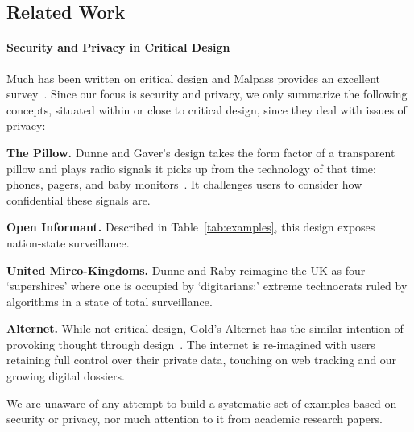 \subsection{Related Work}

\paragraph{Security and Privacy in Critical Design}

Much has been written on critical design and Malpass provides an excellent survey~\cite{Mal17}. Since our focus is security and privacy, we only summarize the following concepts, situated within or close to critical design, since they deal with issues of privacy: 

\begin{compactlist}
\item \textbf{The Pillow.} Dunne and Gaver's design takes the form factor of a transparent pillow and plays radio signals it picks up from the technology of that time: \eg phones, pagers, and baby monitors~\cite{DuGa97}. It challenges users to consider how confidential these signals are.  
\item \textbf{Open Informant.} Described in Table~\ref{tab:examples}, this design exposes nation-state surveillance.
\item \textbf{United Mirco-Kingdoms.} Dunne and Raby reimagine the UK as four `supershires' where one is occupied by `digitarians:' extreme technocrats ruled by algorithms in a state of total surveillance.  
\item \textbf{Alternet.} While not critical design, Gold's Alternet has the similar intention of provoking thought through design~\cite{Gol14}. The internet is re-imagined with users retaining full control over their private data, touching on web tracking and our growing digital dossiers. 
\end{compactlist}

We are unaware of any attempt to build a systematic set of examples based on security or privacy, nor much attention to it from academic research papers. %


